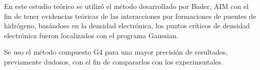 En este estudio teórico se utilizó el método desarrollado por Bader, AIM \cite{quimica6} con el fin de tener evidencias teóricas de las interacciones por formaciones de puentes de hidrógeno, basándose en la densidad electrónica, los puntos críticos de densidad electrónica fueron localizados con el programa Gaussian.

Se uso el método compuesto G4 para una mayor precisión de resultados, previamente dudosos, con el fin de compararlos con los experimentales.
 